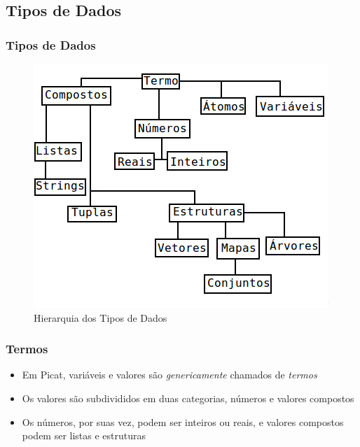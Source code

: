 \subsection{Tipos de Dados}


\begin{frame}
	\frametitle{Tipos de Dados}
	

	\begin{figure}[!ht]
		\centering
		\includegraphics[width = .725\linewidth]{figures/tipos_dados_picat__traduzido3.png}
		\caption{Hierarquia dos Tipos de Dados}
		\label{fig:TiposDados}
	\end{figure}
\end{frame}


\begin{frame}
	\frametitle{Termos}

\begin{itemize}
	  \item Em Picat, variáveis e valores são \textit{genericamente} chamados de \textit{termos}
	
	  \pause 
	  \item Os valores são subdivididos em duas categorias, números e valores 
	compostos
	
		  \item Os números, por suas vez, podem ser inteiros ou reais, e valores compostos
	podem ser listas e estruturas
	
	
	\end{itemize}	
\end{frame}

